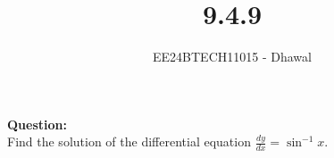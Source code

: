 \documentclass[journal]{IEEEtran}
\begin{document}

\vspace{3cm}

\title{9.4.9}
\author{EE24BTECH11015 - Dhawal}

{\let\newpage\relax\maketitle}

\renewcommand{\thefigure}{\theenumi}
\renewcommand{\thetable}{\theenumi}
\setlength{\intextsep}{10pt} %

\textbf{Question:}\\
Find the solution of the differential equation $\frac{dy}{dx}=\sin^{-1}{x}$.
\end{document}
